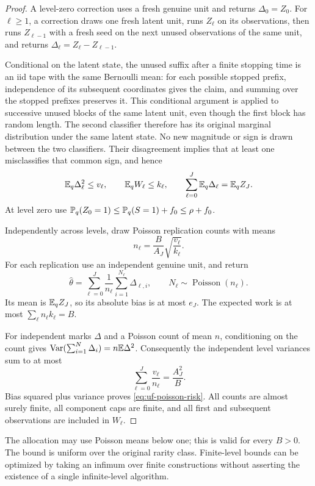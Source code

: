 \begin{proof}
A level-zero correction uses a fresh genuine unit and returns
$\Delta_0=Z_0$. For $\ell\ge1$, a correction draws one fresh latent unit,
runs $Z_\ell$ on its observations, then runs $Z_{\ell-1}$ with a fresh
seed on the next unused observations of the same unit, and returns
$\Delta_\ell=Z_\ell-Z_{\ell-1}$.

Conditional on the latent state, the unused suffix after a finite
stopping time is an iid tape with the same Bernoulli mean: for each
possible stopped prefix, independence of its subsequent coordinates
gives the claim, and summing over the stopped prefixes preserves it.
This conditional argument is applied to successive unused blocks of
the same latent unit, even though the first block has random length.
The second classifier therefore has its original marginal distribution
under the same latent state. No new magnitude or sign is drawn between
the two classifiers. Their disagreement implies that at least one
misclassifies that common sign, and hence
\[
 \mathbb E_q\Delta_\ell^2\le v_\ell,\qquad
 \mathbb E_q W_\ell\le k_\ell,\qquad
 \sum_{\ell=0}^J\mathbb E_q\Delta_\ell=\mathbb E_qZ_J.
\]
At level zero use
$\mathbb P_q(Z_0=1)\le\mathbb P_q(S=1)+f_0\le\rho+f_0$.

Independently across levels, draw Poisson replication counts with means
\[
 n_\ell=\frac B{A_J}\sqrt{\frac{v_\ell}{k_\ell}}.
\]
For each replication use an independent genuine unit, and return
\[
 \widehat\theta
 =\sum_{\ell=0}^J\frac1{n_\ell}
       \sum_{i=1}^{N_\ell}\Delta_{\ell,i},
 \qquad N_\ell\sim\operatorname{Poisson}(n_\ell).
\]
Its mean is $\mathbb E_qZ_J$, so its absolute bias is at most $e_J$.
The expected work is at most
$\sum_\ell n_\ell k_\ell=B$.

For independent marks $\Delta$ and a Poisson count of mean $n$,
conditioning on the count gives
$\operatorname{Var}(\sum_{i=1}^{N}\Delta_i)=n\mathbb E\Delta^2$.
Consequently the independent level variances sum to at most
\[
 \sum_{\ell=0}^J\frac{v_\ell}{n_\ell}=\frac{A_J^2}{B}.
\]
Bias squared plus variance proves \eqref{eq:uf-poisson-risk}.
All counts are almost surely finite, all component caps are finite,
and all first and subsequent observations are included in $W_\ell$.
\end{proof}

The allocation may use Poisson means below one; this is valid for
every $B>0$. The bound is uniform over the original rarity class.
Finite-level bounds can be optimized by taking an infimum over
finite constructions without asserting the existence of a single
infinite-level algorithm.


